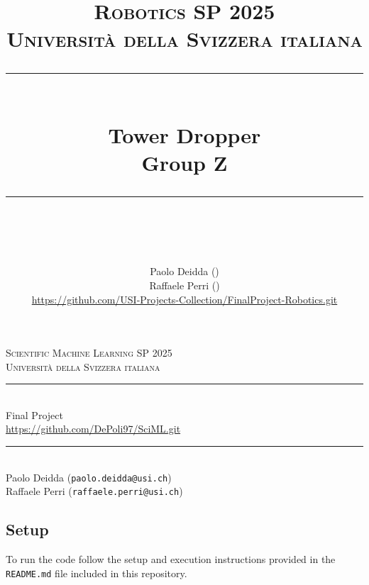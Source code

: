 \documentclass[twocolumn]{article}
\title{
	\normalfont\normalsize
	\textsc{Robotics SP 2025\\
	Universit\`a della Svizzera italiana}\\
	\rule{\linewidth}{0.5pt}\\
	{\huge Tower Dropper\\
	\small Group Z}\\
	\rule{\linewidth}{1pt}\\
	\vspace{5pt}
}
\author{
	Paolo Deidda (\text{paolo.deidda@usi.ch}) \\ 
	Raffaele Perri (\text{raffaele.perri@usi.ch})\\
	\url{https://github.com/USI-Projects-Collection/FinalProject-Robotics.git}
	}
\begin{document}
\begin{titlepage}
    \begin{center}
        \textsc{Scientific Machine Learning SP 2025\\
        Universit\`a della Svizzera italiana}\\[1ex]
        
        \rule{\linewidth}{0.5pt}\\[1ex]
        \huge Final Project\\[0.5ex]
        \normalsize
        \url{https://github.com/DePoli97/SciML.git}
        \rule{\linewidth}{1pt}\\[2ex]

        Paolo Deidda (\texttt{paolo.deidda@usi.ch})\\
        Raffaele Perri (\texttt{raffaele.perri@usi.ch})\\[1ex]
    \end{center}

    \vspace{2em}
    \tableofcontents

    \vfill
    \subsection*{Setup}
    To run the code follow the setup and execution instructions provided in the \texttt{README.md} file included in this repository.
\end{titlepage}

% 

% 

% 

% 

% 
\end{document}
